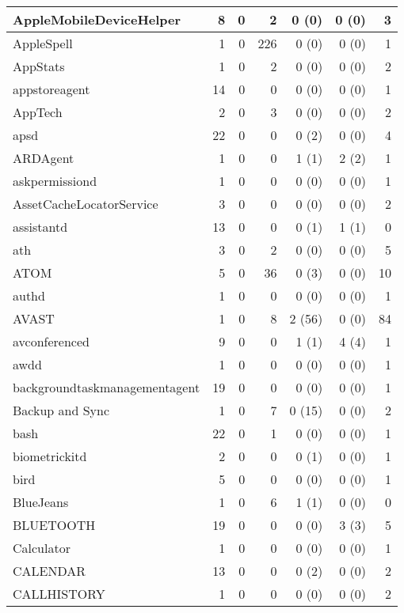 \begin{adjustwidth}{-2in}{}
\begin{scriptsize}
\begin{longtable}[l]{ l | r | r | r | r | r | r }
    AppleMobileDeviceHelper &  8 &  0 &  2 &  0 (0) &  0 (0) &  3 \\ \hline
    AppleSpell & 1 &  0 &  226 &  0 (0) &  0 (0) &  1 \\ \hline
    AppStats & 1 &  0 &  2 &  0 (0) &  0 (0) &  2 \\ \hline
    appstoreagent & 14 &  0 &  0 &  0 (0) &  0 (0) &  1 \\ \hline
    AppTech &  2 &  0 &  3 &  0 (0) &  0 (0) &  2 \\ \hline
    apsd &  22 &  0 &  0 &  0 (2) &  0 (0) &  4 \\ \hline
    ARDAgent & 1 &  0 &  0 &  1 (1) &  2 (2) &  1 \\ \hline
    askpermissiond & 1 &  0 &  0 &  0 (0) &  0 (0) &  1 \\ \hline
    AssetCacheLocatorService & 3 &  0 &  0 &  0 (0) &  0 (0) &  2 \\ \hline
    assistantd &  13 &  0 &  0 &  0 (1) &  1 (1) &  0 \\ \hline
    ath &  3 &  0 &  2 &  0 (0) &  0 (0) &  5 \\ \hline
    ATOM & 5 &  0 & 36 &  0 (3) &  0 (0) & 10 \\ \hline
    authd &  1 &  0 &  0 &  0 (0) &  0 (0) &  1 \\ \hline
    AVAST &  1 &  0 &  8 & 2 (56) &  0 (0) & 84 \\ \hline
    avconferenced &  9 &  0 &  0 &  1 (1) &  4 (4) &  1 \\ \hline
    awdd & 1 &  0 &  0 &  0 (0) &  0 (0) &  1 \\ \hline
    backgroundtaskmanagementagent & 19 &  0 &  0 &  0 (0) &  0 (0) &  1 \\ \hline
    Backup and Sync &  1 &  0 &  7 & 0 (15) &  0 (0) &  2 \\ \hline
    bash &  22 &  0 &  1 &  0 (0) &  0 (0) &  1 \\ \hline
    biometrickitd &  2 &  0 &  0 &  0 (1) &  0 (0) &  1 \\ \hline
    bird & 5 &  0 &  0 &  0 (0) &  0 (0) &  1 \\ \hline
    BlueJeans &  1 &  0 &  6 &  1 (1) &  0 (0) &  0 \\ \hline
    BLUETOOTH & 19 &  0 &  0 &  0 (0) &  3 (3) &  5 \\ \hline
    Calculator & 1 &  0 &  0 &  0 (0) &  0 (0) &  1 \\ \hline
    CALENDAR &  13 &  0 &  0 &  0 (2) &  0 (0) &  2 \\ \hline
    CALLHISTORY &  1 &  0 &  0 &  0 (0) &  0 (0) &  2 \\ \hline

\end{longtable}
\end{scriptsize}
\end{adjustwidth}
